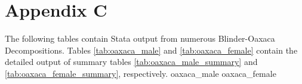 \documentclass[class=article, crop=false]{standalone}
\begin{document}
\section{Appendix C}
\label{sec:appendixC}
The following tables contain Stata output from numerous Blinder-Oaxaca Decompositions. Tables \ref{tab:oaxaca_male} and \ref{tab:oaxaca_female} contain the detailed output of summary tables \ref{tab:oaxaca_male_summary} and \ref{tab:oaxaca_female_summary}, respectively.
{}
{oaxaca_male}
\newpage
{oaxaca_female}
\doublespacing

\ifstandalone

\fi
\end{document}
